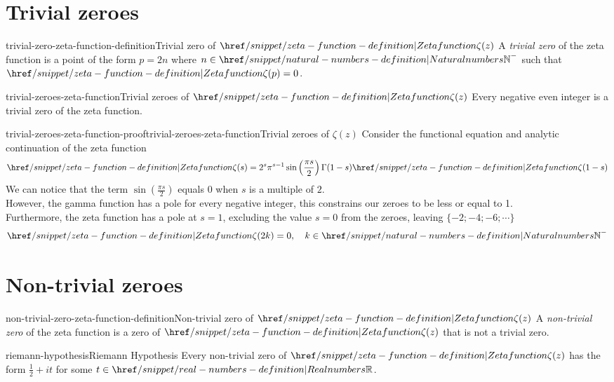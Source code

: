 \documentclass[preview]{standalone}
\begin{document}
\genpage

\section{Trivial zeroes}

\begin{snippetdefinition}{trivial-zero-zeta-function-definition}{Trivial zero of \(\zetafn(z)\)}
    A \textit{trivial zero} of the zeta function is a point of the form \(p = 2n\)
    where \(n \in {\naturalnumbers}^-\) such that \(\zetafn(p)=0\).
\end{snippetdefinition}

\begin{snippetproposition}{trivial-zeroes-zeta-function}{Trivial zeroes of \(\zetafn(z)\)}
    Every negative even integer is a trivial zero of the zeta function.
\end{snippetproposition}

\begin{snippetproof}{trivial-zeroes-zeta-function-proof}{trivial-zeroes-zeta-function}{Trivial zeroes of \(\zeta(z)\)}
    Consider the functional equation and analytic continuation of the zeta function
    \begin{align*}
        \zetafn(s)=2^s\pi^{s-1}\sin\left(\frac{\pi s}{2}\right)\Gamma(1-s)\zetafn(1-s)
    \end{align*}
    We can notice that the term \(\sin\left(\frac{\pi s}{2}\right)\) equals \(0\) when \(s\) is a multiple of \(2\).
    \\
    However, the gamma function has a pole for every negative integer, this constrains our zeroes to be less or equal to 1.\\
    Furthermore, the zeta function has a pole at \(s=1\), excluding the value \(s=0\) from the zeroes, leaving \(\{-2;-4;-6;\cdots\}\)
    \begin{align*}
        \zetafn(2k)=0,
        \quad k\in {\naturalnumbers}^{-}
    \end{align*}
\end{snippetproof}

\section{Non-trivial zeroes}

\begin{snippetdefinition}{non-trivial-zero-zeta-function-definition}{Non-trivial zero of \(\zetafn(z)\)}
    A \textit{non-trivial zero} of the zeta function is a zero of \(\zetafn(z)\)
    that is not a trivial zero.
\end{snippetdefinition}

\begin{snippetproposition}{riemann-hypothesis}{Riemann Hypothesis}
    Every non-trivial zero of \(\zetafn(z)\) has the form \(\frac{1}{2} + it\)
    for some \(t \in \realnumbers\).
\end{snippetproposition}

\end{document}
